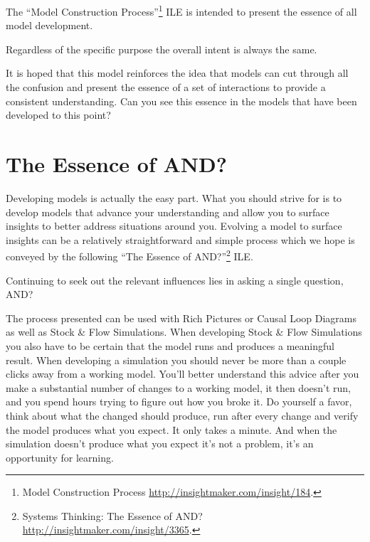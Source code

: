 \documentclass[]{memoir}
\begin{document}
The ``Model Construction Process''\footnote{Model Construction Process
  \url{http://insightmaker.com/insight/184}.} ILE is intended to present
the essence of all model development.

\FloatBarrier 

\begin{model}[frametitle={Model: Model Construction Process}] 

 Regardless of the specific purpose the overall intent is always the same.




 \end{model}

It is hoped that this model reinforces the idea that models can cut
through all the confusion and present the essence of a set of
interactions to provide a consistent understanding. Can you see this
essence in the models that have been developed to this point?

\section{The Essence of AND?}

Developing models is actually the easy part. What you should strive for
is to develop models that advance your understanding and allow you to
surface insights to better address situations around you. Evolving a
model to surface insights can be a relatively straightforward and simple
process which we hope is conveyed by the following ``The Essence of
AND?''\footnote{Systems Thinking: The Essence of AND?
  \url{http://insightmaker.com/insight/3365}.} ILE.

\FloatBarrier 

\begin{model}[frametitle={Model: Systems Thinking: The Essence of AND?}] 

 Continuing to seek out the relevant influences lies in asking a single question, AND?




 \end{model}

The process presented can be used with Rich Pictures or Causal Loop
Diagrams as well as Stock \& Flow Simulations. When developing Stock \&
Flow Simulations you also have to be certain that the model runs and
produces a meaningful result. When developing a simulation you should
never be more than a couple clicks away from a working model. You'll
better understand this advice after you make a substantial number of
changes to a working model, it then doesn't run, and you spend hours
trying to figure out how you broke it. Do yourself a favor, think about
what the changed should produce, run after every change and verify the
model produces what you expect. It only takes a minute. And when the
simulation doesn't produce what you expect it's not a problem, it's an
opportunity for learning.
\end{document}
